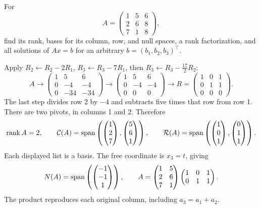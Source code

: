 \begin{example}\label{example:03:rank-computation}
For
\[
A=\begin{pmatrix}1&5&6\\2&6&8\\7&1&8\end{pmatrix},
\]
find its rank, bases for its column, row, and null spaces, a rank factorization,
and all solutions of \(Ax=b\) for an arbitrary \(b=(b_1,b_2,b_3)^\top\).

Apply \(R_2\leftarrow R_2-2R_1\), \(R_3\leftarrow R_3-7R_1\),
then \(R_3\leftarrow R_3-\tfrac{17}{2}R_2\):
\[
A\longrightarrow
\begin{pmatrix}1&5&6\\0&-4&-4\\0&-34&-34\end{pmatrix}
\longrightarrow
\begin{pmatrix}1&5&6\\0&-4&-4\\0&0&0\end{pmatrix}
\longrightarrow
R=\begin{pmatrix}1&0&1\\0&1&1\\0&0&0\end{pmatrix}.
\]
The last step divides row 2 by \(-4\) and subtracts five times that row from row 1.
There are two pivots, in columns 1 and 2. Therefore
\[
\operatorname{rank} A=2,\qquad
\mathcal C(A)=\operatorname{span}\left(\begin{pmatrix}1\\2\\7\end{pmatrix},
\begin{pmatrix}5\\6\\1\end{pmatrix}\right),\qquad
\mathcal R(A)=\operatorname{span}\left(\begin{pmatrix}1\\0\\1\end{pmatrix},
\begin{pmatrix}0\\1\\1\end{pmatrix}\right).
\]
Each displayed list is a basis. The free coordinate is \(x_3=t\), giving
\[
N(A)=\operatorname{span}\left(\begin{pmatrix}-1\\-1\\1\end{pmatrix}\right),\qquad
A=\begin{pmatrix}1&5\\2&6\\7&1\end{pmatrix}
\begin{pmatrix}1&0&1\\0&1&1\end{pmatrix}.
\]
The product reproduces each original column, including \(a_3=a_1+a_2\).


\end{example}
